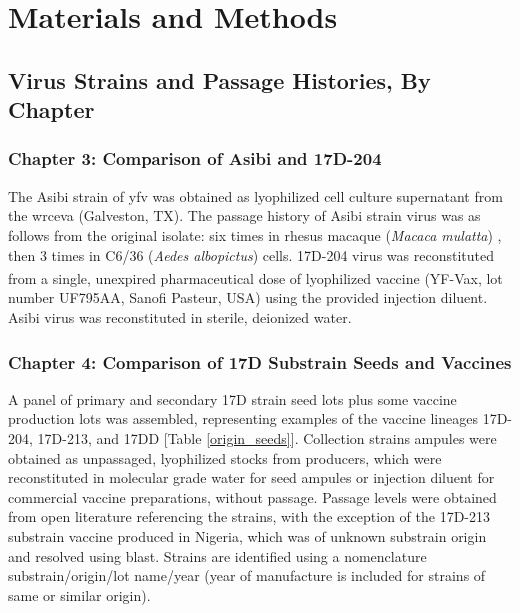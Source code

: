 \chapter{Materials and Methods}

\section{Virus Strains and Passage Histories, By Chapter}

\subsection{Chapter 3: Comparison of Asibi and 17D-204}
The Asibi strain of \gls{yfv} was obtained as lyophilized cell culture supernatant from the \gls{wrceva} (Galveston, TX). The passage history of Asibi strain virus was as follows from the original isolate: six times in rhesus macaque (\emph{Macaca mulatta}) \parencite{Stokes:1928uh}, then 3 times in C6/36 (\emph{Aedes albopictus}) cells. 17D-204 virus was reconstituted from a single, unexpired pharmaceutical dose of lyophilized vaccine (YF-Vax\textsuperscript{\textregistered}, lot number UF795AA, Sanofi Pasteur, USA) using the provided injection diluent. Asibi virus was reconstituted in sterile, deionized water.    
\subsection{Chapter 4: Comparison of 17D Substrain Seeds and Vaccines}
A panel of primary and secondary 17D strain seed lots plus some vaccine production lots was assembled, representing examples of the vaccine lineages 17D-204, 17D-213, and 17DD [Table \ref{origin_seeds}]. Collection strains ampules were obtained as unpassaged, lyophilized stocks from producers, which were reconstituted in molecular grade water for seed ampules or injection diluent for commercial vaccine preparations, without passage. Passage levels were obtained from open literature referencing the strains, with the exception of the 17D-213 substrain vaccine produced in Nigeria, which was of unknown substrain origin and resolved using \gls{blast}. Strains are identified using a nomenclature substrain/origin/lot name/year (year of manufacture is included for strains of same or similar origin).
